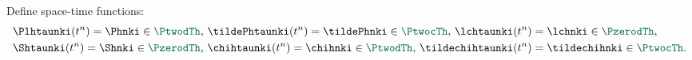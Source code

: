 \documentclass[10 pt]{beamer}
\begin{document}
\begin{frame}
Define space-time functions:\begin{equation}
\label{eq:def:functions:space:time}
\begin{split}
&\Plhtaunki(t^n) = \Phnki \in \textcolor{cadmiumgreen}{\PtwodTh}, \hspace{0.06 cm} \tildePhtaunki(t^n) = \tildePhnki \in \textcolor{cadmiumgreen}{\PtwocTh}, \hspace{0.06 cm} \lchtaunki(t^n) = \lchnki\in \textcolor{cadmiumgreen}{\PzerodTh}, \\ 
&\Shtaunki(t^n) = \Shnki \in \textcolor{cadmiumgreen}{\PzerodTh}, \hspace{0.06 cm}
 \chihtaunki(t^n) = \chihnki \in \textcolor{cadmiumgreen}{\PtwodTh}, \hspace{0.06 cm} \tildechihtaunki(t^n) = \tildechihnki \in \textcolor{cadmiumgreen}{\PtwocTh}.
\end{split}
\end{equation}
\end{frame}
\end{document}
